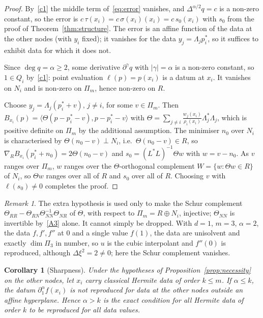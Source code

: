 \documentclass[12pt]{amsart}
\newtheorem{corollary}[theorem]{Corollary}
\theoremstyle{definition}
\theoremstyle{remark}
\newtheorem{remark}[theorem]{Remark}
\newcommand{\Pm}{\Pi_m}
\begin{document}
\begin{proof}
By~\ref{c1} the middle term of~\eqref{eq:error} vanishes, and $\Delta^{\alpha/2}q=c$ is a
non-zero constant, so the error is $c\,\tau(x_i)=c\,\sigma(x_i)(x_i)=c\,s_0(x_i)$ with $s_0$
from the proof of Theorem~\ref{thm:structure}. The error is an affine function of the data at
the other nodes (with $y_i$ fixed); it vanishes for the data $y_j=\Lambda_jp_i^*$, so it
suffices to exhibit data for which it does not.

Since $\deg q=\alpha\ge2$, some derivative $\partial^\gamma q$ with $|\gamma|=\alpha$ is a
non-zero constant, so $1\in Q_i$ by~\ref{c1}: point evaluation $\ell(p)=p(x_i)$ is a datum at
$x_i$. It vanishes on $N_i$ and is non-zero on $\Pm$, hence non-zero on $R$.

Choose $y_j=\Lambda_j(p_i^*+v)$, $j\ne i$, for some $v\in\Pm$. Then
$B_{x_i}(p)=\langle \Theta(p-p_i^*-v),p-p_i^*-v\rangle$ with
$\Theta=\sum_{j\ne i}\frac{w_j(x_i)}{\rho_i(x_i)}\Lambda_j^*\Lambda_j$, which is positive definite on
$\Pm$ by the additional assumption. The minimiser $n_0$ over $N_i$ is characterised by
$\Theta(n_0-v)\perp N_i$, i.e.\ $\Theta(n_0-v)\in R$, so $\nabla_RB_{x_i}(p_i^*+n_0)=2\Theta(n_0-v)$ and
$s_0=(L^*L)^{-1}\Theta w$ with $w=v-n_0$. As $v$ ranges over $\Pm$, $w$ ranges over the
$\Theta$-orthogonal complement $W=\{w:\Theta w\in R\}$ of $N_i$, so $\Theta w$ ranges over all of $R$ and
$s_0$ over all of $R$. Choosing $v$ with $\ell(s_0)\ne0$ completes the proof.
\end{proof}

\begin{remark}\label{rem:necessity-hyp}
The extra hypothesis is used only to make the Schur complement
$\Theta_{RR}-\Theta_{RN}\Theta_{NN}^{-1}\Theta_{NR}$ of $\Theta$, with respect to $\Pm=R\oplus N_i$, injective; $\Theta_{NN}$ is
invertible by~\ref{A3} alone. It cannot simply be dropped. With $d=1$, $m=3$, $\alpha=2$, the
data $f,f',f''$ at $0$ and a single value $f(1)$, the data are unisolvent and exactly $\dim\Pi_3$
in number, so $u$ is the cubic interpolant and $f''(0)$ is reproduced, although
$\Delta\xi^2=2\ne0$; here the Schur complement vanishes.
\end{remark}

\begin{corollary}[Sharpness]\label{cor:sharp}
Under the hypotheses of Proposition~\ref{prop:necessity} on the other nodes, let $x_i$ carry
classical Hermite data of order $k\le m$. If $\alpha\le k$, the datum $\partial_1^\alpha f(x_i)$
is not reproduced for data at the other nodes outside an affine hyperplane. Hence $\alpha>k$ is
the exact condition for all Hermite data of order $k$ to be reproduced for all data values.
\end{corollary}
\end{document}

